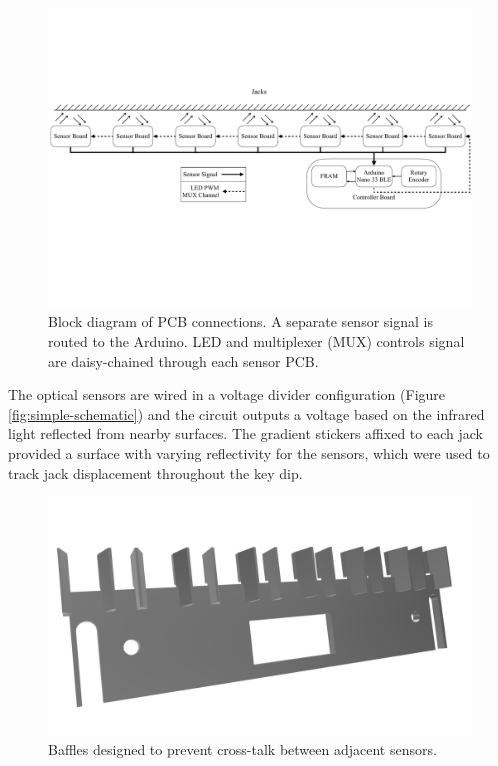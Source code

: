 \begin{figure}
    \centering
    \includegraphics[width=\linewidth]{src/images/block-diagram-2.pdf}
    \caption{Block diagram of PCB connections. A separate sensor signal is routed to the Arduino. LED and multiplexer (MUX) controls signal are daisy-chained through each sensor PCB.}
    \label{fig:system-block-diagram}
\end{figure}

The optical sensors are wired in a voltage divider configuration (Figure \ref{fig:simple-schematic}) and the circuit outputs a voltage based on the infrared light reflected from nearby surfaces. 
The gradient stickers affixed to each jack provided a surface with varying reflectivity for the sensors, which were used to track jack displacement throughout the key dip. 

\begin{figure}[!t]
    \centering
    \includegraphics[width=0.8\linewidth,trim={0 2cm 0 2.5cm},clip]{src/images/baffles.png}
    \caption{Baffles designed to prevent cross-talk between adjacent sensors.}
    \Description{}
    \label{fig:baffles}
\end{figure}

